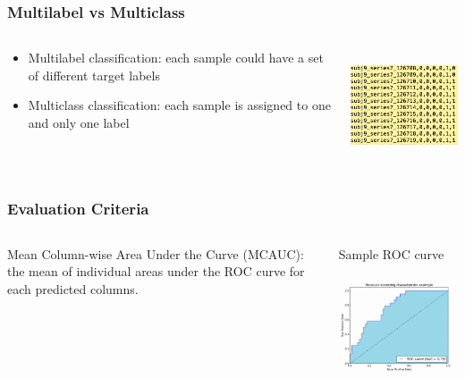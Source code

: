 \documentclass{beamer}
\begin{document}
\begin{frame}
\frametitle{Multilabel vs Multiclass}

\begin{columns}[T]
\begin{column}{.5\textwidth}
\begin{itemize} 
\item Multilabel classification: each sample could have a set of different target labels
\item Multiclass classification: each sample is assigned to one and only one label
\end{itemize}
\end{column}
\begin{column}{.5\textwidth}
\begin{center}
\includegraphics[height=1.3in]{multiLabel.png}
\end{center}
\end{column}
\end{columns}

\end{frame}


\begin{frame}
\frametitle{Evaluation Criteria}
\begin{columns}[T]
\begin{column}{.5\textwidth}
Mean Column-wise Area Under the Curve (MCAUC): the mean of individual areas under the ROC curve for each predicted columns.

\end{column}
\begin{column}{.5\textwidth}
\begin{center}
Sample ROC curve 
\includegraphics[height=1.5in]{9NpXJ.png}
\end{center}
\end{column}
\end{columns}


\end{frame}
\end{document}
